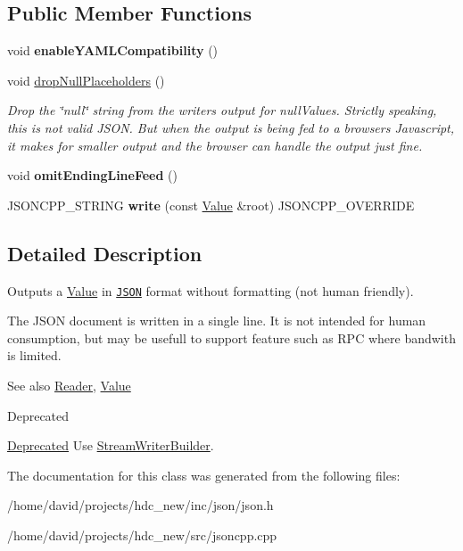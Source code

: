 \subsection*{Public Member Functions}
\begin{DoxyCompactItemize}
\item 
void {\bfseries enable\+Y\+A\+M\+L\+Compatibility} ()\hypertarget{class_json_1_1_fast_writer_a78d98e9f76d33660ad6e6a1abe287d45}{}\label{class_json_1_1_fast_writer_a78d98e9f76d33660ad6e6a1abe287d45}

\item 
void \hyperlink{class_json_1_1_fast_writer_a6e93d8dce951e408517311026a065b40}{drop\+Null\+Placeholders} ()\hypertarget{class_json_1_1_fast_writer_a6e93d8dce951e408517311026a065b40}{}\label{class_json_1_1_fast_writer_a6e93d8dce951e408517311026a065b40}

\begin{DoxyCompactList}\small\item\em Drop the \char`\"{}null\char`\"{} string from the writer\textquotesingle{}s output for null\+Values. Strictly speaking, this is not valid J\+S\+ON. But when the output is being fed to a browser\textquotesingle{}s Javascript, it makes for smaller output and the browser can handle the output just fine. \end{DoxyCompactList}\item 
void {\bfseries omit\+Ending\+Line\+Feed} ()\hypertarget{class_json_1_1_fast_writer_af4ee077d365d75941fb2688d97207a55}{}\label{class_json_1_1_fast_writer_af4ee077d365d75941fb2688d97207a55}

\item 
J\+S\+O\+N\+C\+P\+P\+\_\+\+S\+T\+R\+I\+NG {\bfseries write} (const \hyperlink{class_json_1_1_value}{Value} \&root) J\+S\+O\+N\+C\+P\+P\+\_\+\+O\+V\+E\+R\+R\+I\+DE\hypertarget{class_json_1_1_fast_writer_a93d45ba4bc312371d08beb3e3dfbe654}{}\label{class_json_1_1_fast_writer_a93d45ba4bc312371d08beb3e3dfbe654}

\end{DoxyCompactItemize}


\subsection{Detailed Description}
Outputs a \hyperlink{class_json_1_1_value}{Value} in \href{http://www.json.org}{\tt J\+S\+ON} format without formatting (not human friendly). 

The J\+S\+ON document is written in a single line. It is not intended for \textquotesingle{}human\textquotesingle{} consumption, but may be usefull to support feature such as R\+PC where bandwith is limited. \begin{DoxySeeAlso}{See also}
\hyperlink{class_json_1_1_reader}{Reader}, \hyperlink{class_json_1_1_value}{Value} 
\end{DoxySeeAlso}
\begin{DoxyRefDesc}{Deprecated}
\item[\hyperlink{deprecated__deprecated000008}{Deprecated}]Use \hyperlink{class_json_1_1_stream_writer_builder}{Stream\+Writer\+Builder}. \end{DoxyRefDesc}


The documentation for this class was generated from the following files\+:\begin{DoxyCompactItemize}
\item 
/home/david/projects/hdc\+\_\+new/inc/json/json.\+h\item 
/home/david/projects/hdc\+\_\+new/src/jsoncpp.\+cpp\end{DoxyCompactItemize}
